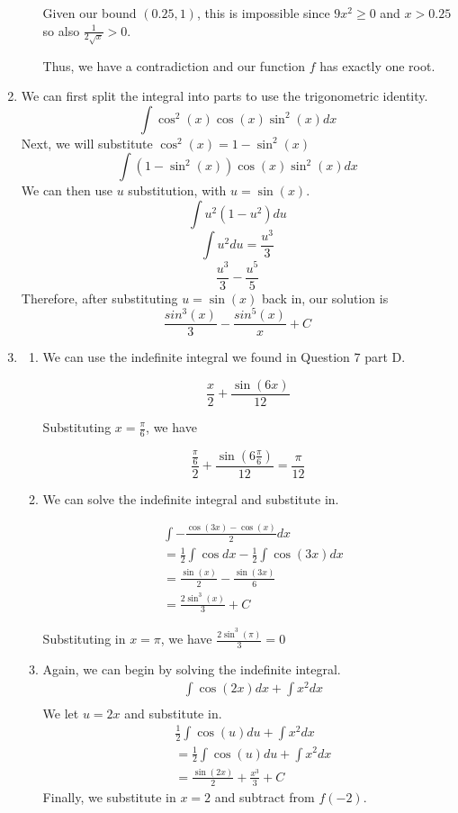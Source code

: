 \documentclass[11pt, letterpaper, twoside]{article}
\begin{document}
\begin{enumerate}
\begin{enumerate}[label=\alph*)]
Given our bound \((0.25, 1)\), this is impossible since \(9x^2\geq0\) and \(x>0.25\) so also \(\frac{1}{2\sqrt x}>0\).

Thus, we have a contradiction and our function \(f\) has exactly one root.

\end{enumerate}
\item %
We can first split the integral into parts to use the trigonometric identity.
\[\int \cos^2(x)\cos(x)\sin^2(x)dx\]
Next, we will substitute \(\cos^2(x)=1-\sin^2(x)\)
\[\int(1-\sin^2(x))\cos(x)\sin^2(x)dx\]
We can then use \(u\) substitution, with \(u=\sin(x)\). 
\[\int u^2(1-u^2)du\]
\[\int u^2du = \frac{u^3}{3}\]
\[\frac{u^3}{3}-\frac{u^5}{5}\]
Therefore, after substituting \(u=\sin(x)\) back in, our solution is 
\[\frac{sin^3(x)}{3}-\frac{sin^5(x)}{x}+C\]

\item %
\begin{enumerate}[label=\alph*)]
\item  %
We can use the indefinite integral we found in Question 7 part D.

\[\frac{x}{2}+\frac{\sin(6x)}{12}\]

Substituting \(x=\frac{\pi}{6}\), we have 

\[\frac{\frac{\pi}{6}}{2}+\frac{\sin(6\frac{\pi}{6})}{12}=\boxed{\frac{\pi}{12}}\]

\item We can solve the indefinite integral and substitute in.

\begin{align*}
&\int -\frac{\cos(3x)-\cos(x)}{2}dx\\
&=\frac{1}{2}\int \cos dx-\frac{1}{2}\int\cos(3x)dx\\
&=\frac{\sin(x)}{2}-\frac{\sin(3x)}{6}\\
&=\frac{2\sin^3(x)}{3}+C
\end{align*}

Substituting in \(x=\pi\), we have \(\frac{2\sin^3(\pi)}{3}=\boxed{0}\)

\item Again, we can begin by solving the indefinite integral.
\begin{align*}
&\int\cos(2x)dx+\int x^2dx\\
\end{align*}
We let \(u=2x\) and substitute in.
\begin{align*}
&\frac{1}{2}\int\cos(u)du+\int x^2dx\\
&=\frac{1}{2}\int\cos(u)du+\int x^2 dx\\
&=\frac{\sin(2x)}{2}+\frac{x^3}{3}+C
\end{align*}
Finally, we substitute in \(x=2\) and subtract from \(f(-2)\).


\end{enumerate}
\end{enumerate}
\end{document}
